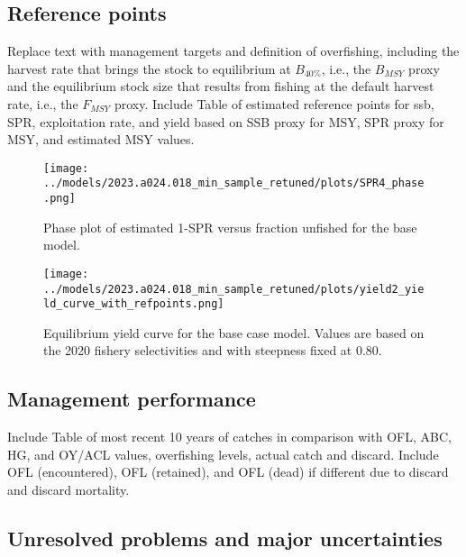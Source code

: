 \documentclass[11pt,
  english,
  letterpaper,
]{article}
\begin{document}
\hypertarget{reference-points}{%
\subsection*{Reference points}\label{reference-points}}

Replace text with management targets and definition of overfishing, including the harvest rate that brings the stock to equilibrium at \(B_{40\%}\), i.e., the \(B_{MSY}\) proxy and the equilibrium stock size that results from fishing at the default harvest rate, i.e., the \(F_{MSY}\) proxy. Include Table of estimated reference points for ssb, SPR, exploitation rate, and yield based on SSB proxy for MSY, SPR proxy for MSY, and estimated MSY values.

\begin{figure}
\centering
\texttt{[image: ../models/2023.a024.018\_min\_sample\_retuned/plots/SPR4\_phase.png]}
\caption{Phase plot of estimated 1-SPR versus fraction unfished for the base model.\label{fig:es-phase}}
\end{figure}

\begin{figure}
\centering
\texttt{[image: ../models/2023.a024.018\_min\_sample\_retuned/plots/yield2\_yield\_curve\_with\_refpoints.png]}
\caption{Equilibrium yield curve for the base case model. Values are based on the 2020 fishery selectivities and with steepness fixed at 0.80.\label{fig:es-yield}}
\end{figure}



\clearpage

\hypertarget{management-performance}{%
\subsection*{Management performance}\label{management-performance}}

Include Table of most recent 10 years of catches in comparison with OFL, ABC, HG, and OY/ACL values, overfishing levels, actual catch and discard. Include OFL (encountered), OFL (retained), and OFL (dead) if different due to discard and discard mortality.

\hypertarget{unresolved-problems-and-major-uncertainties}{%
\subsection*{Unresolved problems and major uncertainties}\label{unresolved-problems-and-major-uncertainties}}
\end{document}
